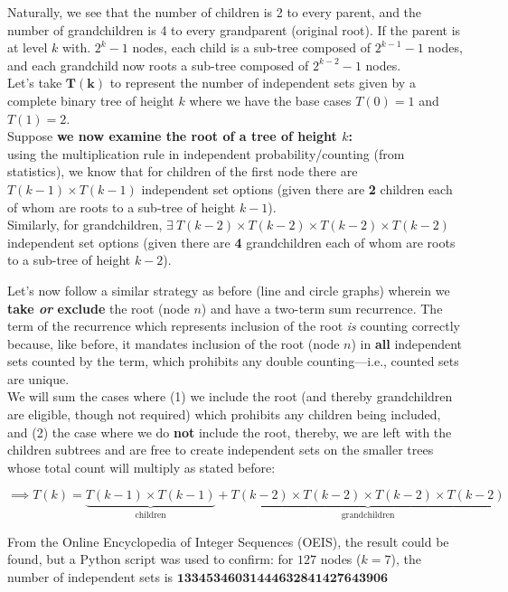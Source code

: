\documentclass[conference]{styles/acmsiggraph}
\newcommand{\?}{\stackrel{?}{=}}
\DeclareRobustCommand{\mybox}[2][gray!20]{%
\begin{tcolorbox}[   %
        breakable,
        left=0pt,
        right=0pt,
        top=0pt,
        bottom=0pt,
        colback=#1,
        colframe=#1,
        width=\dimexpr\textwidth\relax, 
        enlarge left by=0mm,
        boxsep=5pt,
        arc=0pt,outer arc=0pt,
        ]
        #2
\end{tcolorbox}
}
\begin{document}
Naturally, we see that the number of children is 2 to every parent, and the number of grandchildren is 4 to every grandparent (original root).  If the parent is at level $k$ with. $2^k - 1$ nodes, each child is a sub-tree composed of $2^{k-1} - 1$ nodes, and each grandchild now roots a sub-tree composed of $2^{k-2} - 1$ nodes.\\

Let's take $\mathbf{T(k)}$ to represent the number of independent sets given by a complete binary tree of height $k$ where we have the base cases $T(0) = 1$ and $T(1) = 2$.\\

Suppose \textbf{we now examine the root of a tree of height $k$:}\\using the multiplication rule in independent probability/counting (from statistics), we know that for children of the first node there are $T(k-1) \times T(k-1)$ independent set options (given there are \textbf{2} children each of whom are roots to a sub-tree of height $k-1$).\\

Similarly, for grandchildren, $\exists\  T(k-2) \times T(k-2) \times T(k-2) \times T(k-2) $ independent set options (given there are \textbf{4} grandchildren each of whom are roots to a sub-tree of height $k-2$).

Let's now follow a similar strategy as before (line and circle graphs) wherein we \textbf{take \textit{or} exclude} the root (node $n$) and have a two-term sum recurrence.  The term of the recurrence which represents inclusion of the root \textit{is} counting correctly because, like before, it mandates inclusion of the root (node $n$) in \textbf{all} independent sets counted by the term, which prohibits any double counting---i.e., counted sets are unique.\\

We will sum the cases where (1) we include the root (and thereby grandchildren are eligible, though not required) which prohibits any children being included, and (2) the case where we do \textbf{not} include the root, thereby, we are left with the children subtrees and are free to create independent sets on the smaller trees whose total count will multiply as stated before:

$$\implies T(k) = \underbrace{T(k-1) \times T(k-1)}_{\text{children}} + \underbrace{T(k-2) \times T(k-2) \times T(k-2) \times T(k-2)}_{\text{grandchildren}}$$



\mybox{
From the Online Encyclopedia of Integer Sequences (OEIS), the result could be found, but a Python script was used to confirm: for $127$ nodes ($k = 7$), the number of independent sets is $\mathbf{13345346031444632841427643906}$}
\end{document}
